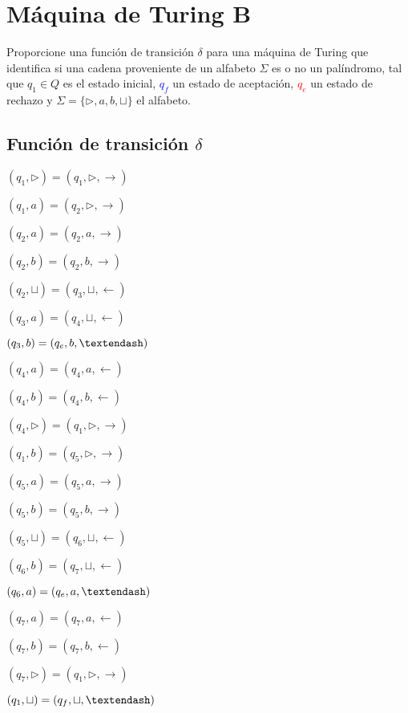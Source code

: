 \documentclass[letterpaper,11pt]{article}
\begin{document}
\break

\section{Máquina de Turing B}

Proporcione una función de transición $\delta$ para una máquina de Turing que identifica si una cadena proveniente de un alfabeto $\Sigma$ es o no un palíndromo, tal que $q_1\in Q$ es el estado inicial, \textcolor{blue}{$q_f$} un estado de aceptación, \textcolor{red}{$q_e$} un estado de rechazo y $\Sigma = \{\rhd,a,b,\sqcup\}$ el alfabeto.

\subsection{Función de transición $\delta$}
\begin{multicols}{2}
\begin{enumerate}
\item $(q_1,\rhd) = (q_1,\rhd,\rightarrow)$
\item $(q_1,a) = (q_2,\rhd,\rightarrow)$
\item $(q_2,a) = (q_2,a,\rightarrow)$
\item $(q_2,b) = (q_2,b,\rightarrow)$
\item $(q_2,\sqcup) = (q_3,\sqcup,\leftarrow)$
\item $(q_3,a) = (q_4,\sqcup,\leftarrow)$
\textcolor{red}{\item $(q_3,b) = (q_e,b,\textendash)$}
\item $(q_4,a) = (q_4,a,\leftarrow)$
\item $(q_4,b) = (q_4,b,\leftarrow)$
\item $(q_4,\rhd) = (q_1,\rhd,\rightarrow)$
\item $(q_1,b) = (q_5,\rhd,\rightarrow)$
\item $(q_5,a) = (q_5,a,\rightarrow)$
\item $(q_5,b) = (q_5,b,\rightarrow)$
\item $(q_5,\sqcup) = (q_6,\sqcup,\leftarrow)$
\item $(q_6,b) = (q_7,\sqcup,\leftarrow)$
\textcolor{red}{\item $(q_6,a) = (q_e,a,\textendash)$}
\item $(q_7,a) = (q_7,a,\leftarrow)$
\item $(q_7,b) = (q_7,b,\leftarrow)$
\item $(q_7,\rhd) = (q_1,\rhd,\rightarrow)$
\textcolor{blue}{\item $(q_1,\sqcup) = (q_f,\sqcup,\textendash)$}

\end{enumerate}
\end{multicols}
\end{document}
